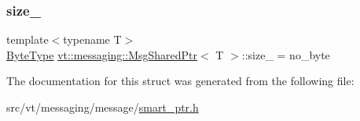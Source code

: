 \mbox{\label{structvt_1_1messaging_1_1_msg_shared_ptr_aa3d0c6c8f14e94de5f4c5e67c81f9ff1}} 
\subsubsection{\texorpdfstring{size\+\_\+}{size\_}}
{\footnotesize\ttfamily template$<$typename T$>$ \\
\hyperlink{namespacevt_aab8d55968084610ce3b17057981e9300}{Byte\+Type} \hyperlink{structvt_1_1messaging_1_1_msg_shared_ptr}{vt\+::messaging\+::\+Msg\+Shared\+Ptr}$<$ T $>$\+::size\+\_\+ = no\+\_\+byte\hspace{0.3cm}{\ttfamily [private]}}



The documentation for this struct was generated from the following file\+:\begin{DoxyCompactItemize}
\item 
src/vt/messaging/message/\hyperlink{smart__ptr_8h}{smart\+\_\+ptr.\+h}\end{DoxyCompactItemize}
